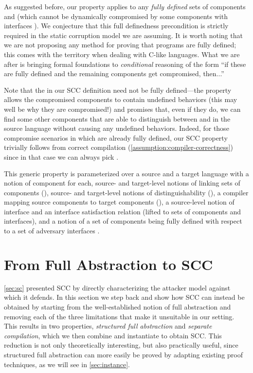 \documentclass[10pt, conference, compsocconf, letterpaper, times]{IEEEtran}
\begin{document}
As suggested before, our property applies to any {\em fully defined}
sets of components  and  (which cannot be dynamically
compromised by some components with interfaces \ifsooner{}\fi).
We conjecture that this full definedness precondition is strictly
required in the static corruption model we are assuming.
It is worth noting that we are not proposing any method for proving that
programs are fully 
defined; this comes with the territory when dealing with
C-like languages.
What we are after is bringing formal foundations
to {\em conditional} reasoning of the form ``if these  are fully
defined and the remaining components  get compromised,
then...''

Note that the  in our SCC definition need not be fully defined---\IE the
property allows the compromised components to contain undefined
behaviors (this may well be why they are compromised!) and promises
that, even if they do, we can find some other components 
that are able to distinguish between  and  in
the source language without causing any undefined behaviors.
Indeed, for those compromise scenarios in which  are already
fully defined, our SCC property trivially follows from correct
compilation (\autoref{assumption:compiler-correctness}) since in that case
we can always pick .

This generic property is parameterized over
  a source and a target language with a notion of component for each,
  source- and target-level notions of linking sets of components (),
  source- and target-level notions of distinguishability (),
  a compiler mapping source components to target components (),
  a source-level notion of interface and an interface satisfaction relation
  (lifted
to sets of components and interfaces), and
  a notion of a set of components  being
  fully defined with respect to a set of adversary interfaces .

\section{From Full Abstraction to SCC}
\label{sec:fa-not-enough}

\ifsooner
{}
\fi

\autoref{sec:sc} presented SCC by directly
characterizing the attacker model against which it defends.
In this section we step back and show how SCC can instead be obtained by
starting from the well-established notion of full abstraction and
removing each of the three limitations that make it unsuitable
in our setting.
This results in two properties, {\em structured full abstraction} and {\em
  separate compilation}, which we then combine and instantiate to obtain SCC.
This reduction is
not only theoretically interesting, but also practically useful,
since structured full abstraction can more easily be proved by adapting
existing proof techniques, as we will see in \autoref{sec:instance}.
\end{document}
